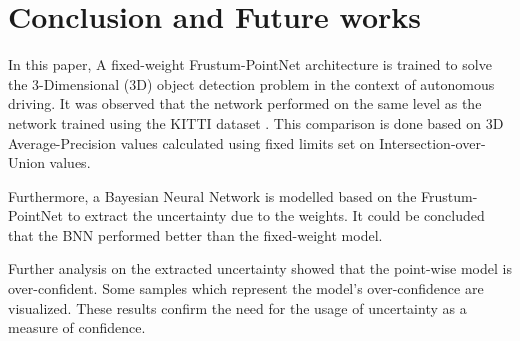 \documentclass[10pt,twocolumn,letterpaper]{article}
\begin{document}
\section{Conclusion and Future works}
In this paper, A fixed-weight Frustum-PointNet \cite{FPointnet2018} architecture is trained to solve the 3-Dimensional (3D) object detection problem in the context of autonomous driving. It was observed that the network performed on the same level as the network trained using the KITTI dataset \cite{KITTI2012}. This comparison is done based on 3D Average-Precision values calculated using fixed limits set on Intersection-over-Union values.
    
Furthermore, a Bayesian Neural Network is modelled based on the Frustum-PointNet \cite{FPointnet2018} to extract the uncertainty due to the weights. It could be concluded that the BNN performed better than the fixed-weight model.

Further analysis on the extracted uncertainty showed that the point-wise model is over-confident. Some samples which represent the model's over-confidence are visualized. These results confirm the need for the usage of uncertainty as a measure of confidence.


{\small


}
\end{document}

